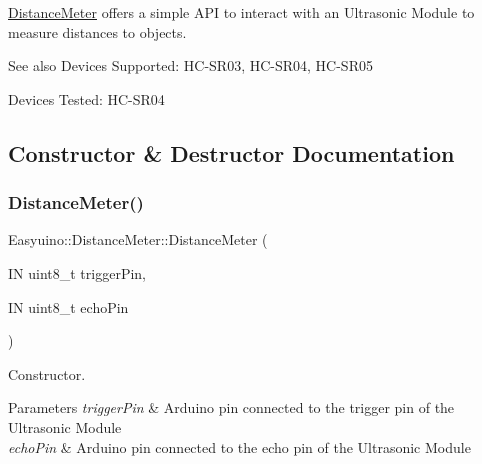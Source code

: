 \hyperlink{class_easyuino_1_1_distance_meter}{Distance\+Meter} offers a simple A\+PI to interact with an Ultrasonic Module to measure distances to objects. \begin{DoxySeeAlso}{See also}
Devices Supported\+: H\+C-\/\+S\+R03, H\+C-\/\+S\+R04, H\+C-\/\+S\+R05 

Devices Tested\+: H\+C-\/\+S\+R04 
\end{DoxySeeAlso}


\subsection{Constructor \& Destructor Documentation}
\mbox{\label{class_easyuino_1_1_distance_meter_aad61ebf8398ba5cf6a80e5defc29bfcc}} 
\subsubsection{\texorpdfstring{Distance\+Meter()}{DistanceMeter()}\hspace{0.1cm}{\footnotesize\ttfamily [1/2]}}
{\footnotesize\ttfamily Easyuino\+::\+Distance\+Meter\+::\+Distance\+Meter (\begin{DoxyParamCaption}\item[{IN uint8\+\_\+t}]{trigger\+Pin,  }\item[{IN uint8\+\_\+t}]{echo\+Pin }\end{DoxyParamCaption})}



Constructor. 


\begin{DoxyParams}{Parameters}
{\em trigger\+Pin} & Arduino pin connected to the trigger pin of the Ultrasonic Module \\
\hline
{\em echo\+Pin} & Arduino pin connected to the echo pin of the Ultrasonic Module \\
\hline
\end{DoxyParams}
\mbox{\label{class_easyuino_1_1_distance_meter_aa5551cc3c42fe77f0972a41acf896cf9}} 
